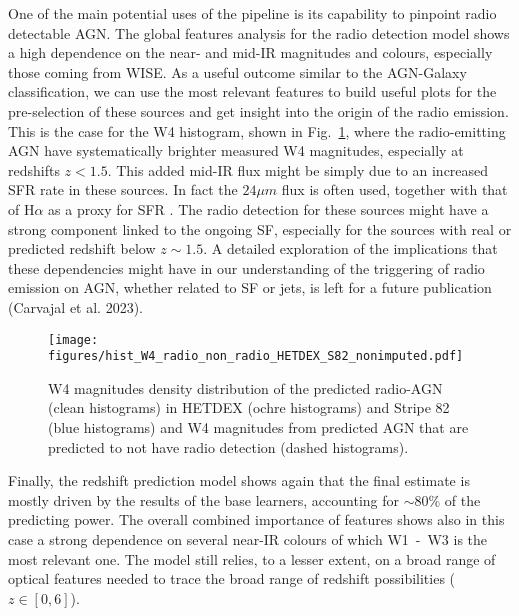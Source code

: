 \documentclass{aa}
\begin{document}
One of the main potential uses of the pipeline is its capability to pinpoint radio detectable AGN. The global features analysis for the radio detection model shows a high dependence on the near- and mid-IR magnitudes and colours, especially those coming from WISE. As a useful outcome similar to the AGN-Galaxy classification, we can use the most relevant features to build useful plots for the pre-selection of these sources and get insight into the origin of the radio emission. This is the case for the W4 histogram, shown in Fig.~\ref{fig:hist_W4_nonimputed_pred_radio_non_radio_AGN}, where the radio-emitting AGN have systematically brighter measured W4 magnitudes, especially at redshifts ${z < 1.5}$. This added mid-IR flux might be simply due to an increased SFR rate in these sources. In fact the $24\mu m$ flux is often used, together with that of H$\alpha$ as a proxy for SFR \citep{2009ApJ...703.1672K}. The radio detection for these sources might have a strong component linked to the ongoing SF, especially for the sources with real or predicted redshift below ${z {\sim} 1.5}$. A detailed exploration of the implications that these dependencies might have in our understanding of the triggering of radio emission on AGN, whether related to SF or jets, is left for a future publication (Carvajal et al. 2023).


\begin{figure}
  \centering
    \texttt{[image: figures/hist\_W4\_radio\_non\_radio\_HETDEX\_S82\_nonimputed.pdf]}
  \caption{W4 magnitudes density distribution of the predicted radio-AGN  (clean histograms) in HETDEX (ochre histograms) and Stripe 82 (blue histograms) and W4 magnitudes from predicted AGN that are predicted to not have radio detection (dashed histograms).}
  \label{fig:hist_W4_nonimputed_pred_radio_non_radio_AGN}
\end{figure}

Finally, the redshift prediction model shows again that the final estimate is mostly driven by the results of the base learners, accounting for ${\sim} 80\%$ of the predicting power. The overall combined importance of features shows also in this case a strong dependence on several near-IR colours of which W1~-~W3 is the most relevant one. 
The model still relies, to a lesser extent, on a broad range of optical features needed to trace the broad range of redshift possibilities ($z \in [0,6]$).%
\end{document}
